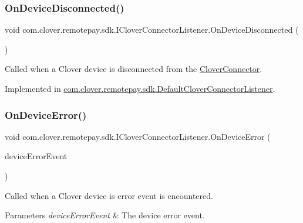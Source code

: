 \subsubsection{\texorpdfstring{On\+Device\+Disconnected()}{OnDeviceDisconnected()}}
{\footnotesize\ttfamily void com.\+clover.\+remotepay.\+sdk.\+I\+Clover\+Connector\+Listener.\+On\+Device\+Disconnected (\begin{DoxyParamCaption}{ }\end{DoxyParamCaption})}



Called when a Clover device is disconnected from the \hyperlink{classcom_1_1clover_1_1remotepay_1_1sdk_1_1_clover_connector}{Clover\+Connector}. 



Implemented in \hyperlink{classcom_1_1clover_1_1remotepay_1_1sdk_1_1_default_clover_connector_listener_a2768c7875db334d7615cfac32b8a9115}{com.\+clover.\+remotepay.\+sdk.\+Default\+Clover\+Connector\+Listener}.

\mbox{\label{interfacecom_1_1clover_1_1remotepay_1_1sdk_1_1_i_clover_connector_listener_ab342b91dab98cd7ee976973315251291}} 
\subsubsection{\texorpdfstring{On\+Device\+Error()}{OnDeviceError()}}
{\footnotesize\ttfamily void com.\+clover.\+remotepay.\+sdk.\+I\+Clover\+Connector\+Listener.\+On\+Device\+Error (\begin{DoxyParamCaption}\item[{\hyperlink{classcom_1_1clover_1_1remotepay_1_1sdk_1_1_clover_device_error_event}{Clover\+Device\+Error\+Event}}]{device\+Error\+Event }\end{DoxyParamCaption})}



Called when a Clover device is error event is encountered. 


\begin{DoxyParams}{Parameters}
{\em device\+Error\+Event} & The device error event.\\
\hline
\end{DoxyParams}


